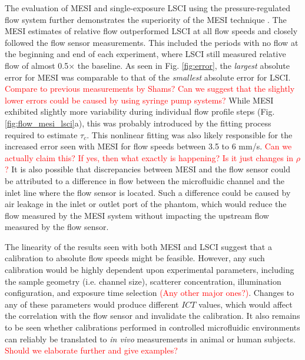 \documentclass[12pt]{spieman}
\begin{document}
\begin{spacing}{2}
The evaluation of MESI and single-exposure LSCI using the pressure-regulated flow system further demonstrates the superiority of the MESI technique \cite{Kazmi:2013hp,Sullender.2022}. The MESI estimates of relative flow outperformed LSCI at all flow speeds and closely followed the flow sensor measurements. This included the periods with no flow at the beginning and end of each experiment, where LSCI still measured relative flow of almost 0.5$\times$ the baseline. As seen in Fig. \ref{fig:error}, the \textit{largest} absolute error for MESI was comparable to that of the \textit{smallest} absolute error for LSCI. \textcolor{red}{Compare to previous measurements by Shams? Can we suggest that the slightly lower errors could be caused by using syringe pump systems?} While MESI exhibited slightly more variability during individual flow profile steps (Fig. \ref{fig:flow_mesi_lsci}a), this was probably introduced by the fitting process required to estimate $\tau_c$. This nonlinear fitting was also likely responsible for the increased error seen with MESI for flow speeds between 3.5 to 6 mm/s. \textcolor{red}{Can we actually claim this? If yes, then what exactly is happening? Is it just changes in $\rho$?} It is also possible that discrepancies between MESI and the flow sensor could be attributed to a difference in flow between the microfluidic channel and the inlet line where the flow sensor is located. Such a difference could be caused by air leakage in the inlet or outlet port of the phantom, which would reduce the flow measured by the MESI system without impacting the upstream flow measured by the flow sensor.

The linearity of the results seen with both MESI and LSCI suggest that a calibration to absolute flow speeds might be feasible. However, any such calibration would be highly dependent upon experimental parameters, including the sample geometry (i.e. channel size), scatterer concentration, illumination configuration, and exposure time selection \textcolor{red}{(Any other major ones?)}. Changes to any of these parameters would produce different $ICT$ values, which would affect the correlation with the flow sensor and invalidate the calibration. It also remains to be seen whether calibrations performed in controlled microfluidic environments can reliably be translated to \textit{in vivo} measurements in animal or human subjects. \textcolor{red}{Should we elaborate further and give examples?}


\end{spacing}
\end{document}
